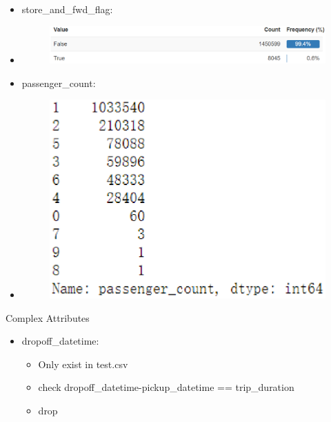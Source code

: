 \documentclass[
 size=14pt,
 paper=smartboard,  %
 mode=present, 		%
 display=slides, 	%
 style=tuliplab,  	%
 pauseslide,
 fleqn,leqno]{powerdot}
\begin{document}
\begin{slide}[toc=,bm=]{}
  \begin{itemize}
    \item store_and_fwd_flag:
    \item\begin{figure}\includegraphics[scale=0.4]{figures/four.eps}\end{figure}
    \item passenger_count:
    \item\begin{figure}\includegraphics[scale=0.6]{figures/seven.eps}\end{figure}
  \end{itemize}
\end{slide}

\begin{slide}{Complex Attributes}
  \begin{itemize}
    \item dropoff_datetime:
      \begin{itemize}
        \item Only exist in test.csv
        \item check dropoff_datetime-pickup_datetime == trip_duration
        \item drop
      \end{itemize}
  \end{itemize}
\end{slide}
\end{document}

